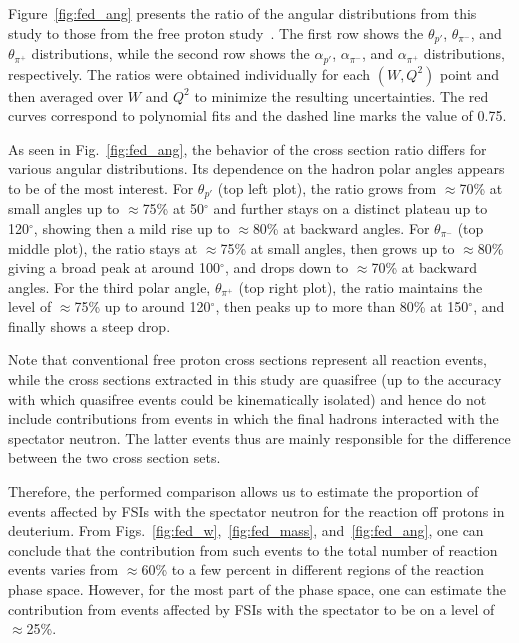 \documentclass[prc,twocolumn,superscriptaddress,showpacs,amssymb,amsmath,amsfonts,aps,nofootinbib]{revtex4-1}
\begin{document}
Figure~\ref{fig:fed_ang} presents the ratio of the angular distributions from this study to those from the free proton study~\cite{Fed_an_note:2017,Fed_paper_2018}. The first row shows the $\theta_{p'}$, $\theta_{\pi^{-}}$, and $\theta_{\pi^{+}}$ distributions, while the second row shows the $\alpha_{p'}$, $\alpha_{\pi^{-}}$, and $\alpha_{\pi^{+}}$ distributions, respectively. The ratios were obtained individually for each $(W,Q^{2})$ point and then averaged over $W$ and $Q^{2}$ to minimize the resulting uncertainties. The red curves correspond to polynomial fits and the dashed line marks the value of 0.75.

As seen in Fig.\!~\ref{fig:fed_ang}, the behavior of the cross section ratio differs for various angular distributions. Its dependence on the hadron polar angles appears to be of the most interest. For $\theta_{p'}$ (top left plot), the ratio grows from $\approx$70\% at small angles up to $\approx$75\% at 50$^{\circ}$ and further stays on a distinct plateau up to 120$^{\circ}$, showing then a mild rise up to $\approx$80\% at backward angles. For $\theta_{\pi^{-}}$ (top middle plot), the ratio stays at $\approx$75\% at small angles, then grows up to $\approx$80\% giving a broad peak at around 100$^{\circ}$, and drops down to $\approx$70\% at backward angles. For the third polar angle, $\theta_{\pi^{+}}$ (top right plot), the ratio maintains the level of $\approx$75\% up to around 120$^{\circ}$, then peaks up to more than 80\% at 150$^{\circ}$, and finally shows a steep drop.


Note that conventional free proton cross sections represent all reaction events, while the cross sections extracted in this study are quasifree (up to the accuracy with which quasifree events could be kinematically isolated) and hence do not include contributions from events in which the final hadrons interacted with the spectator neutron. The latter events thus are mainly responsible for the difference between the two cross section sets. 

Therefore, the performed comparison allows us to estimate the proportion of events affected by FSIs with the spectator neutron for the reaction off protons in deuterium. From Figs.~\ref{fig:fed_w},~\ref{fig:fed_mass}, and~\ref{fig:fed_ang}, one can conclude that the contribution from such events to the total number of reaction events varies from $\approx$60\% to a few percent in different regions of the reaction phase space. However, for the most part of the phase space, one can estimate the contribution from events affected by FSIs with the spectator to be on a level of $\approx$25\%.
\end{document}
